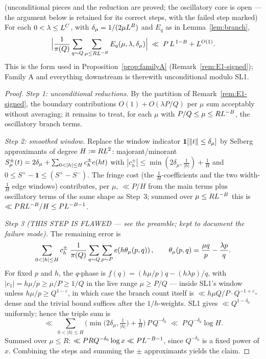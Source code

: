 \begin{proposition}\label{prop:E1}
\statusO{} (unconditional pieces and the reduction are proved; the
oscillatory core is open --- the argument below is retained for its
correct steps, with the failed step marked)\quad
For each $0<\lambda\le L^{C}$, with $\delta_\mu=1/(2\mu L^{B})$
and $E_q$ as in Lemma~\ref{lem:branch},
\[
\Big|\frac{1}{\pi(Q)}\sum_{q\sim Q}\sum_{\mu\le RL^{-B}}
E_q(\mu,\lambda,\delta_\mu)\Big|\;\ll\;P\,L^{\,1-B}+L^{O(1)} .
\]
This is the form used in Proposition~\ref{prop:familyA}
(Remark~\ref{rem:E1-signed}); Family A and everything downstream is
therewith unconditional modulo SL1.
\end{proposition}

\begin{proof}
\emph{Step 1: unconditional reductions.} By the partition of
Remark~\ref{rem:E1-signed}, the boundary contributions
$O(1)+O(\lambda P/Q)$ per $\mu$ sum acceptably without averaging; it
remains to treat, for each $\mu$ with $P/Q\le\mu\le RL^{-B}$, the
oscillatory branch terms.

\emph{Step 2: smoothed window.} Replace the window indicator
$\mathbf 1[\left\| t\right\|\le\delta_\mu]$ by Selberg approximants of degree
$H:=RL^{2}$: majorant/minorant $S^{\pm}_\mu(t)=2\delta_\mu+
\sum_{0<|h|\le H}c^{\pm}_h\e{ht}$ with
$|c^{\pm}_h|\le\min(2\delta_\mu,\tfrac1{|h|})+\tfrac1H$ and
$0\le S^{+}-\mathbf 1\le(S^+-S^-)$. The fringe cost (the
$\tfrac1H$-coefficients and the two width-$\tfrac1H$ edge windows)
contributes, per $\mu$, $\ll P/H$ from the main terms plus oscillatory
terms of the same shape as Step~3; summed over $\mu\le RL^{-B}$
this is $\ll PRL^{-B}/H\le PL^{-B-1}$.

\emph{Step 3 (THIS STEP IS FLAWED --- see the preamble; kept to document the failure mode).} The remaining error is
\[
\sum_{0<|h|\le H}c_h^{\pm}\;\frac1{\pi(Q)}\sum_{q\sim Q}
\sum_{p\sim P}\e{h\theta_\mu(p,q)},\qquad
\theta_\mu(p,q)=\frac{\mu q}{p}-\frac{\lambda p}{q}.
\]
For fixed $p$ and $h$, the $q$-phase is $f(q)=(h\mu/p)q-(h\lambda p)/q$,
with $|c_1|=h\mu/p\ge\mu/P\ge1/Q$ in the live range $\mu\ge P/Q$ ---
inside SL1's window unless $h\mu/p\ge Q^{1-\varepsilon}$, in which case
the branch count itself is $\ll h\mu Q/P\cdot Q^{-1+\varepsilon}$-dense
and the trivial bound suffices after the $1/h$-weights. SL1 gives
$\ll Q^{1-\delta_0}$ uniformly; hence the triple sum is
\[
\ll\;\sum_{0<|h|\le H}\Big(\min\big(2\delta_\mu,\tfrac1{|h|}\big)
+\tfrac1H\Big)\,P\,Q^{-\delta_0}
\;\ll\;P\,Q^{-\delta_0}\log H .
\]
Summed over $\mu\le R$: $\ll PRQ^{-\delta_0}\log x\ll PL^{-B-1}$,
since $Q^{-\delta_0}$ is a fixed power of $x$. Combining the steps and
summing the $\pm$ approximants yields the claim.
\end{proof}

